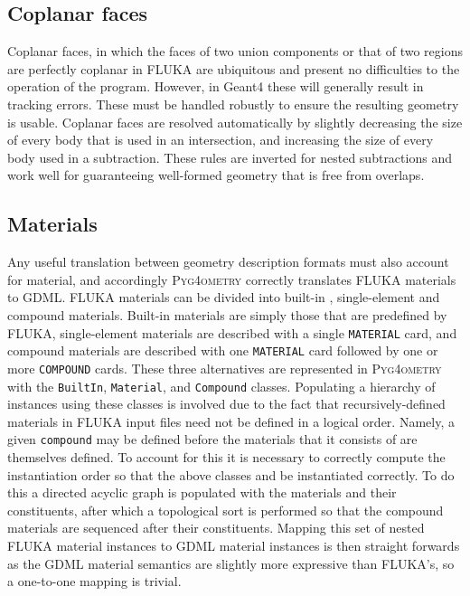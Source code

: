 \documentclass[final,5p,times,twocolumn]{elsarticle}
\newcommand{\pyinline}[1]{\lstinline[postbreak={}]{#1}}
\newcommand{\fluka}[1]{\texttt{\MakeUppercase{#1}}}
\newcommand{\PYGEOMETRY}{\textsc{Pyg4ometry}}
\begin{document}
\subsection{Coplanar faces}
Coplanar faces, in which the faces of two union components or that of
two regions are perfectly coplanar in FLUKA are ubiquitous and present
no difficulties to the operation of the program.  However, in Geant4
these will generally result in tracking errors.  These must be handled
robustly to ensure the resulting geometry is usable.  Coplanar faces
are resolved automatically by slightly decreasing the size of every
body that is used in an intersection, and increasing the size of every
body used in a subtraction.  These rules are inverted for nested
subtractions and work well for guaranteeing well-formed geometry that
is free from overlaps.

\subsection{Materials}

Any useful translation between geometry description formats must also
account for material, and accordingly \PYGEOMETRY{} correctly translates
FLUKA materials to GDML.  FLUKA materials can be divided into built-in ,
single-element and compound materials.  Built-in materials are simply those
that are predefined by FLUKA, single-element materials are described with a
single \fluka{material} card, and compound materials are described with one
\fluka{material} card followed by one or more \fluka{compound} cards.
These three alternatives are represented in \PYGEOMETRY{} with the
\pyinline{BuiltIn}, \pyinline{Material}, and \pyinline{Compound} classes.
Populating a hierarchy of instances using these classes is involved due to
the fact that recursively-defined materials in FLUKA input files need not
be defined in a logical order.  Namely, a given \pyinline{compound} may be
defined before the materials that it consists of are themselves defined.
To account for this it is necessary to correctly compute the instantiation
order so that the above classes and be instantiated correctly.  To do this
a directed acyclic graph is populated with the materials and their
constituents, after which a topological sort is performed so that the
compound materials are sequenced after their constituents.  Mapping this
set of nested FLUKA material instances to GDML material instances is then
straight forwards as the GDML material semantics are slightly more
expressive than FLUKA's, so a one-to-one mapping is trivial.
\end{document}
